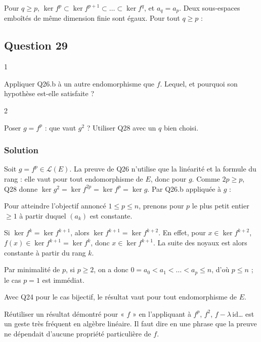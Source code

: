 \documentclass[11pt,a4paper]{article}
\newcommand{\equationajustee}[1]{%
  \sbox{\boiteequation}{$\displaystyle #1$}%
  \ifdim\wd\boiteequation>\linewidth
    \[\resizebox{\linewidth}{!}{\usebox{\boiteequation}}\]%
  \else
    \[#1\]%
  \fi}
\begin{document}
Pour \(q\ge p\), \(\ker f^p\subset\ker f^{p+1}\subset\dots\subset\ker f^q\), et \(a_q=a_p\). Deux sous-espaces emboîtés de même dimension finie sont égaux. Pour tout \(q\ge p\) :
\equationajustee{\boxed{\ker(f^q)=\ker(f^p)}.}

\hypertarget{question-29}{%
\subsection{Question 29}\label{question-29}}

\begin{indication}{1}

Appliquer Q26.b à un autre endomorphisme que \(f\). Lequel, et pourquoi son hypothèse est-elle satisfaite ?

\end{indication}

\begin{indication}{2}

Poser \(g=f^p\) : que vaut \(g^2\) ? Utiliser Q28 avec un \(q\) bien choisi.

\end{indication}

\hypertarget{solution-28}{%
\subsubsection{Solution}\label{solution-28}}

Soit \(g=f^p\in\mathcal L(E)\). La preuve de Q26 n'utilise que la linéarité et la formule du rang : elle vaut pour tout endomorphisme de \(E\), donc pour \(g\). Comme \(2p\ge p\), Q28 donne \(\ker g^2=\ker f^{2p}=\ker f^p=\ker g\). Par Q26.b appliquée à \(g\) :
\equationajustee{\boxed{E=\ker(f^p)\oplus\operatorname{Im}(f^p)}.}

Pour atteindre l'objectif annoncé \(1\le p\le n\), prenons pour \(p\) le plus petit entier \(\ge1\) à partir duquel \((a_k)\) est constante.

Si \(\ker f^k=\ker f^{k+1}\), alors \(\ker f^{k+1}=\ker f^{k+2}\). En effet, pour \(x\in\ker f^{k+2}\), \(f(x)\in\ker f^{k+1}=\ker f^k\), donc \(x\in\ker f^{k+1}\). La suite des noyaux est alors constante à partir du rang \(k\).

Par minimalité de \(p\), si \(p\ge2\), on a donc \(0=a_0<a_1<\dots<a_p\le n\), d'où \(p\le n\) ; le cas \(p=1\) est immédiat.

Avec Q24 pour le cas bijectif, le résultat vaut pour tout endomorphisme de \(E\).

\begin{methode}

Réutiliser un résultat démontré pour « \(f\) » en l'appliquant à \(f^p\), \(f^2\), \(f-\lambda\,\mathrm{id}\)\ldots{} est un geste très fréquent en algèbre linéaire. Il faut dire en une phrase que la preuve ne dépendait d'aucune propriété particulière de \(f\).

\end{methode}
\end{document}

